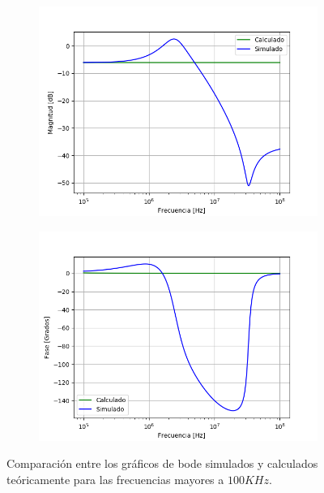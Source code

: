 \begin{figure}[H]
	\centering
	\begin{subfigure}[t]{0.49\textwidth}
	\hspace*{-2cm}
	\centering
		\includegraphics[width=1.2\textwidth]{Imagenes/bodemag_calc_sim_highf.png}
	\end{subfigure}
	\begin{subfigure}[t]{0.49\textwidth}
	\centering
		\includegraphics[width=1.2\textwidth]{Imagenes/bodefase_calc_sim_highf.png}
	\end{subfigure}
	\label{fig:bode_calc_sim_highf}
	\caption{Comparación entre los gráficos de bode simulados y calculados teóricamente para las frecuencias mayores a $100KHz$.}
\end{figure}

